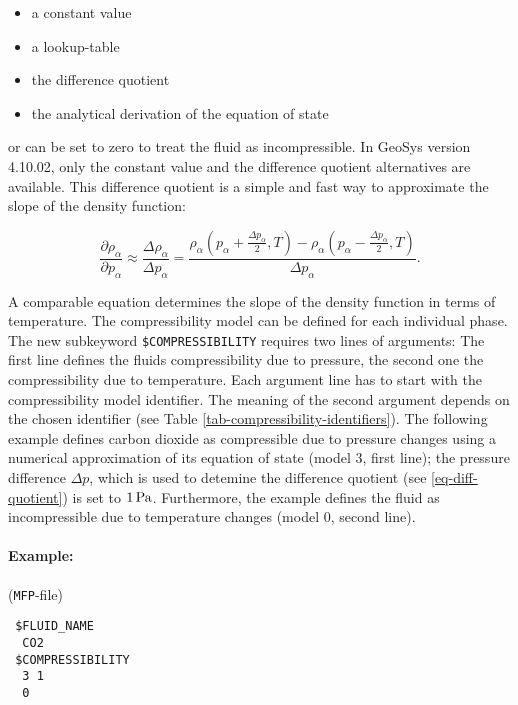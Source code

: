 \begin{itemize}
\item a constant value
\item a lookup-table
\item the difference quotient
\item the analytical derivation of the equation of state
\end{itemize}

or can be set to zero to treat the fluid as incompressible. In GeoSys version 4.10.02, only the constant value and the difference quotient alternatives are available. This difference quotient is a simple and fast way to approximate the slope of the density function:

\begin{equation}
\frac{\partial \rho_\alpha}{\partial p_\alpha} \approx \frac{\Delta \rho_\alpha}{\Delta p_\alpha} = \frac{\rho_\alpha\left(p_\alpha+\frac{\Delta p_\alpha}{2},T\right)-\rho_\alpha\left(p_\alpha-\frac{\Delta p_\alpha}{2},T\right)}{\Delta p_\alpha}.
\label{eq-diff-quotient}
\end{equation}


A comparable equation determines the slope of the density function in terms of temperature. The compressibility model can be defined for each individual phase. The new subkeyword \texttt{\$COMPRESSIBILITY} requires two lines of arguments: The first line defines the fluids compressibility due to pressure, the second one the compressibility due to temperature. Each argument line has to start with the compressibility model identifier. The meaning of the second argument depends on the chosen identifier (see Table \ref{tab-compressibility-identifiers}). The following example defines carbon dioxide as compressible due to pressure changes using a numerical approximation of its equation of state (model 3, first line); the pressure difference $\Delta p$, which is used to detemine the difference quotient (see \eqref{eq-diff-quotient}) is set to $\unit[1]{Pa}$. Furthermore, the example defines the fluid as incompressible due to temperature changes (model 0, second line).

\paragraph{Example:}
(\texttt{MFP}-file)
\begin{verbatim}
 $FLUID_NAME
  CO2
 $COMPRESSIBILITY
  3 1
  0
\end{verbatim}

